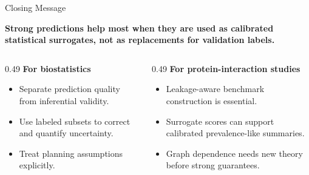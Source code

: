 \documentclass[aspectratio=169,10pt]{beamer}
\begin{document}
\begin{frame}{Closing Message}
\begin{center}
\Large \textbf{Strong predictions help most when they are used as calibrated statistical surrogates, not as replacements for validation labels.}
\end{center}

\vspace{0.4cm}
\begin{columns}[T,totalwidth=\textwidth]
\begin{column}{0.49\textwidth}
\textbf{For biostatistics}
\begin{itemize}
  \item Separate prediction quality from inferential validity.
  \item Use labeled subsets to correct and quantify uncertainty.
  \item Treat planning assumptions explicitly.
\end{itemize}
\end{column}
\begin{column}{0.49\textwidth}
\textbf{For protein-interaction studies}
\begin{itemize}
  \item Leakage-aware benchmark construction is essential.
  \item Surrogate scores can support calibrated prevalence-like summaries.
  \item Graph dependence needs new theory before strong guarantees.
\end{itemize}
\end{column}
\end{columns}
\end{frame}
\end{document}
